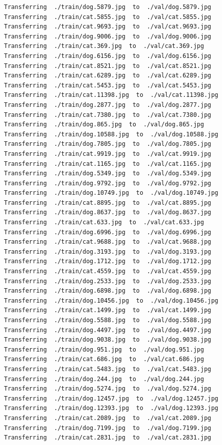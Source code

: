\documentclass[]{book}
\theoremstyle{definition}
\theoremstyle{definition}
\theoremstyle{definition}
\theoremstyle{remark}
\begin{document}
\begin{verbatim}
Transferring  ./train/dog.5879.jpg  to  ./val/dog.5879.jpg
Transferring  ./train/cat.5855.jpg  to  ./val/cat.5855.jpg
Transferring  ./train/cat.9693.jpg  to  ./val/cat.9693.jpg
Transferring  ./train/dog.9006.jpg  to  ./val/dog.9006.jpg
Transferring  ./train/cat.369.jpg  to  ./val/cat.369.jpg
Transferring  ./train/dog.6156.jpg  to  ./val/dog.6156.jpg
Transferring  ./train/cat.8521.jpg  to  ./val/cat.8521.jpg
Transferring  ./train/cat.6289.jpg  to  ./val/cat.6289.jpg
Transferring  ./train/cat.5453.jpg  to  ./val/cat.5453.jpg
Transferring  ./train/cat.11398.jpg  to  ./val/cat.11398.jpg
Transferring  ./train/dog.2877.jpg  to  ./val/dog.2877.jpg
Transferring  ./train/cat.7380.jpg  to  ./val/cat.7380.jpg
Transferring  ./train/dog.865.jpg  to  ./val/dog.865.jpg
Transferring  ./train/dog.10588.jpg  to  ./val/dog.10588.jpg
Transferring  ./train/dog.7805.jpg  to  ./val/dog.7805.jpg
Transferring  ./train/cat.9919.jpg  to  ./val/cat.9919.jpg
Transferring  ./train/cat.1165.jpg  to  ./val/cat.1165.jpg
Transferring  ./train/dog.5349.jpg  to  ./val/dog.5349.jpg
Transferring  ./train/dog.9792.jpg  to  ./val/dog.9792.jpg
Transferring  ./train/dog.10749.jpg  to  ./val/dog.10749.jpg
Transferring  ./train/cat.8895.jpg  to  ./val/cat.8895.jpg
Transferring  ./train/dog.8637.jpg  to  ./val/dog.8637.jpg
Transferring  ./train/cat.633.jpg  to  ./val/cat.633.jpg
Transferring  ./train/dog.6996.jpg  to  ./val/dog.6996.jpg
Transferring  ./train/cat.9688.jpg  to  ./val/cat.9688.jpg
Transferring  ./train/dog.3193.jpg  to  ./val/dog.3193.jpg
Transferring  ./train/dog.1712.jpg  to  ./val/dog.1712.jpg
Transferring  ./train/cat.4559.jpg  to  ./val/cat.4559.jpg
Transferring  ./train/dog.2533.jpg  to  ./val/dog.2533.jpg
Transferring  ./train/dog.6898.jpg  to  ./val/dog.6898.jpg
Transferring  ./train/dog.10456.jpg  to  ./val/dog.10456.jpg
Transferring  ./train/cat.1499.jpg  to  ./val/cat.1499.jpg
Transferring  ./train/dog.5588.jpg  to  ./val/dog.5588.jpg
Transferring  ./train/dog.4497.jpg  to  ./val/dog.4497.jpg
Transferring  ./train/dog.9038.jpg  to  ./val/dog.9038.jpg
Transferring  ./train/dog.951.jpg  to  ./val/dog.951.jpg
Transferring  ./train/cat.686.jpg  to  ./val/cat.686.jpg
Transferring  ./train/cat.5483.jpg  to  ./val/cat.5483.jpg
Transferring  ./train/dog.244.jpg  to  ./val/dog.244.jpg
Transferring  ./train/dog.5274.jpg  to  ./val/dog.5274.jpg
Transferring  ./train/dog.12457.jpg  to  ./val/dog.12457.jpg
Transferring  ./train/dog.12393.jpg  to  ./val/dog.12393.jpg
Transferring  ./train/cat.2089.jpg  to  ./val/cat.2089.jpg
Transferring  ./train/dog.7199.jpg  to  ./val/dog.7199.jpg
Transferring  ./train/cat.2831.jpg  to  ./val/cat.2831.jpg

\end{verbatim}
\end{document}
